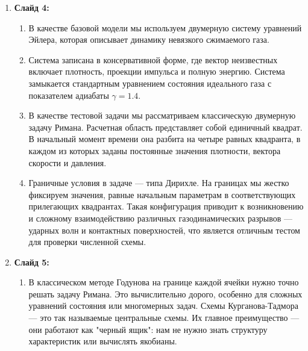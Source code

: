 \documentclass[12pt, a4paper]{article}
\theoremstyle{gostdef}
\begin{document}
\begin{enumerate}
\begin{enumerate}
			\item Второе преимущество — автоматическая векторизация. В двумерном случае нам нужно рассчитывать потоки для каждой ячейки сетки. Вместо того чтобы писать вложенные циклы по координатам X и Y, мы используем встроенную функцию vmap. Она позволяет применить формулу потока сразу ко всей расчетной сетке целиком. Код получается таким же компактным, как для одной ячейки, а математика под капотом обрабатывает весь массив параллельно.
			\item И наконец, нативная поддержка GPU. Зачастую, чтобы перенести расчеты с процессора на видеокарту, нужно переписывать код на C++ и CUDA. Код, написанный на JAX, вообще не требует изменений — он автоматически выполняется на графических ускорителях, если они доступны. Это критически важно для тяжелых задач, вроде двумерного уравнения Эйлера на мелких сетках, которые мы планируем досчитать в ближайшее время.
		\end{enumerate}
		\item \textbf{Слайд 4:}
		\begin{enumerate}
			\item В качестве базовой модели мы используем двумерную систему уравнений Эйлера, которая описывает динамику невязкого сжимаемого газа.
			\item Система записана в консервативной форме, где вектор неизвестных включает плотность, проекции импульса и полную энергию. Система замыкается стандартным уравнением состояния идеального газа с показателем адиабаты $\gamma = 1.4$.
			\item В качестве тестовой задачи мы рассматриваем классическую двумерную задачу Римана. Расчетная область представляет собой единичный квадрат. В начальный момент времени она разбита на четыре равных квадранта, в каждом из которых заданы постоянные значения плотности, вектора скорости и давления.
			\item Граничные условия в задаче — типа Дирихле. На границах мы жестко фиксируем значения, равные начальным параметрам в соответствующих прилегающих квадрантах. Такая конфигурация приводит к возникновению и сложному взаимодействию различных газодинамических разрывов — ударных волн и контактных поверхностей, что является отличным тестом для проверки численной схемы.
		\end{enumerate}
		\item \textbf{Слайд 5:}
		\begin{enumerate}
			\item В классическом методе Годунова на границе каждой ячейки нужно точно решать задачу Римана. Это вычислительно дорого, особенно для сложных уравнений состояния или многомерных задач. Схемы Курганова-Тадмора — это так называемые центральные схемы. Их главное преимущество — они работают как "черный ящик": нам не нужно знать структуру характеристик или вычислять якобианы.

\end{enumerate}
\end{enumerate}
\end{document}

